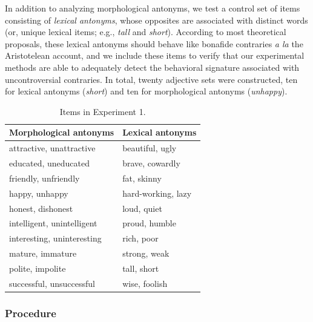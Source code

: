 \documentclass[floatsintext,doc]{apa6}
\begin{document}
In addition to analyzing morphological antonyms, we test a control set of items consisting of \emph{lexical antonyms}, whose opposites are associated with distinct words (or, unique lexical items; e.g., \emph{tall} and \emph{short}). 
According to most theoretical proposals, these lexical antonyms should behave like bonafide contraries \emph{a la} the Aristotelean account, and we include these items to verify that our experimental methods are able to adequately detect the behavioral signature associated with uncontroversial contraries. 
In total, twenty adjective sets were constructed, ten for lexical antonyms (\emph{short}) and ten for morphological antonyms (\emph{unhappy}). 

\begin{table}[h]
\centering
\begingroup\fontsize{10pt}{11pt}\selectfont
\begin{tabular}{ll}
  \hline
Morphological antonyms & Lexical antonyms \\ 
  \hline
attractive, unattractive & beautiful, ugly \\ 
  educated, uneducated & brave, cowardly \\ 
  friendly, unfriendly & fat, skinny \\ 
  happy, unhappy & hard-working, lazy \\ 
  honest, dishonest & loud, quiet \\ 
  intelligent, unintelligent & proud, humble \\ 
  interesting, uninteresting & rich, poor \\ 
  mature, immature & strong, weak \\ 
  polite, impolite & tall, short \\ 
  successful, unsuccessful & wise, foolish \\ 
   \hline
\end{tabular}
\endgroup
\caption{Items in Experiment 1.}
\label{tab:Items}
\end{table}


\subsubsection{Procedure}\label{procedure}
\end{document}
